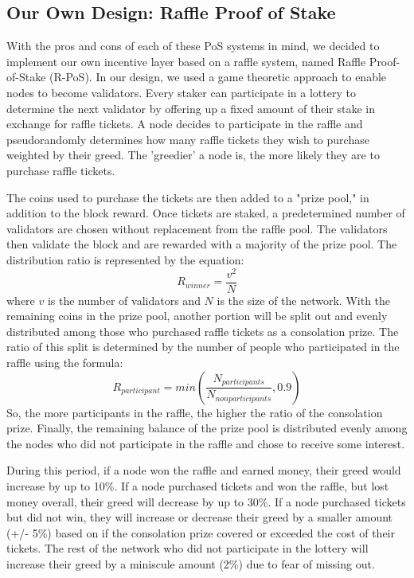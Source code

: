 \subsection{Our Own Design: Raffle Proof of Stake}
With the pros and cons of each of these PoS systems in mind, we decided to implement our own incentive layer based on a raffle system, named Raffle Proof-of-Stake (R-PoS). In our design, we used a game theoretic approach to enable nodes to become validators. Every staker can participate in a lottery to determine the next validator by offering up a fixed amount of their stake in exchange for raffle tickets. A node decides to participate in the raffle and pseudorandomly determines how many raffle tickets they wish to purchase weighted by their greed. The 'greedier' a node is, the more likely they are to purchase raffle tickets.

The coins used to purchase the tickets are then added to a "prize pool," in addition to the block reward. Once tickets are staked, a predetermined number of validators are chosen without replacement from the raffle pool. The validators then validate the block and are rewarded with a majority of the prize pool. The distribution ratio is represented by the equation: 
\begin{equation}
R_{winner} = \frac{v^2}{N}
\end{equation}
where $v$ is the number of validators and $N$ is the size of the network. With the remaining coins in the prize pool, another portion will be split out and evenly distributed among those who purchased raffle tickets as a consolation prize. The ratio of this split is determined by the number of people who participated in the raffle using the formula: 
\begin{equation}
R_{participant} = min\left (\frac{N_{participants}}{N_{nonparticipants}}, 0.9 \right )
\end{equation}
So, the more participants in the raffle, the higher the ratio of the consolation prize. Finally, the remaining balance of the prize pool is distributed evenly among the nodes who did not participate in the raffle and chose to receive some interest.

During this period, if a node won the raffle and earned money, their greed would increase by up to 10\%. If a node purchased tickets and won the raffle, but lost money overall, their greed will decrease by up to 30\%. If a node purchased tickets but did not win, they will increase or decrease their greed by a smaller amount (+\slash- 5\%) based on if the consolation prize covered or exceeded the cost of their tickets. The rest of the network who did not participate in the lottery will increase their greed by a miniscule amount (2\%) due to fear of missing out.

